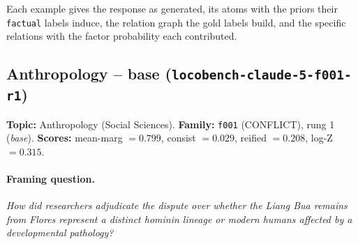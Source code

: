 \documentclass[11pt]{article}
\begin{document}
Each example gives the response as generated, its atoms with the priors their \texttt{factual} labels induce, the relation graph the gold labels build, and the specific relations with the factor probability each contributed.

\subsection{Anthropology -- base (\texttt{locobench-claude-5-f001-r1})}

\textbf{Topic:} Anthropology (Social Sciences). \textbf{Family:} \texttt{f001} (CONFLICT), rung 1 (\emph{base}). \textbf{Scores:} mean-marg $= 0.799$, consist $= 0.029$, reified $= 0.208$, log-Z $= 0.315$.



\paragraph{Framing question.} \emph{How did researchers adjudicate the dispute over whether the Liang Bua remains from Flores represent a distinct hominin lineage or modern humans affected by a developmental pathology?}
\end{document}
